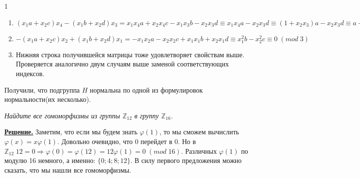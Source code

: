 \documentclass[14pt,a4paper]{scrartcl}
\begin{document}
\begin{spacing}{1}
\begin{enumerate}
		\item $(x_1a+x_2c)x_4 - (x_1b+x_2d)x_3 = x_1x_4a + x_2x_4c - x_1x_3b-x_2x_3d \equiv x_1x_4a-x_2x_3d \equiv (1 + x_2x_3)a - x_2x_3d \equiv a + x_2x_3(a - d) \equiv a \equiv 1\;(mod\;3)$
		\item $-(x_1a+x_2c)x_2 + (x_1b+x_2d)x_1 = -x_1x_2a - x_2x_2c + x_1x_1b+x_2x_1d \equiv x_1^2b - x_2^2c \equiv 0\;(mod\;3)$
		\item Нижняя строка получившейся матрицы тоже удовлетворяет свойствам выше. Проверяется аналогично двум случаям выше заменой соответствующих индексов.
	\end{enumerate}
	Получили, что подгруппа $H$ нормальна по одной из формулировок нормальности(их несколько).
	
	
	\begin{center}
	\end{center}
	\textit{Найдите все гомоморфизмы из группы $\mathbb{Z}_{12}$ в группу $\mathbb{Z}_{16}$.}
	
	\textbf{\underline{Решение.}} Заметим, что если мы будем знать $\varphi(1)$, то мы сможем вычислить $\varphi(x) = x\varphi(1)$. Довольно очевидно, что 0 перейдет в 0. Но в $\mathbb{Z}_{12}\;12 = 0 \Rightarrow \varphi(0) = \varphi(12) = 12\varphi(1) = 0\;(mod\;16)$. Различных $\varphi(1)$ по модулю 16 немного, а именно: $\{0; 4; 8; 12\}$. В силу первого предложения можно сказать, что мы нашли все гомоморфизмы.
\end{spacing}
\end{document}
